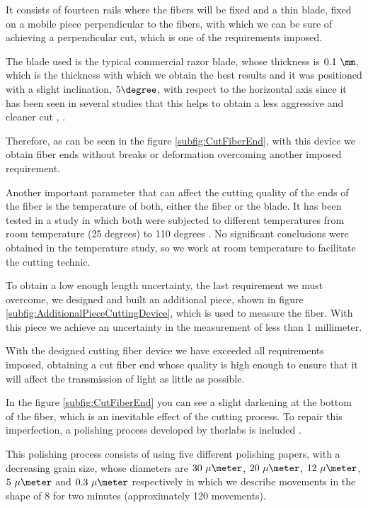 It consists of fourteen rails where the fibers will be fixed and a thin blade, fixed on a mobile piece perpendicular to the fibers, with which we can be sure of achieving a perpendicular cut, which is one of the requirements imposed.

The blade used is the typical commercial razor blade, whose thickness is $0.1~\mm$, which is the thickness with which we obtain the best results and it was positioned with a slight inclination, $5\degree$, with respect to the horizontal axis since it has been seen in several studies that this helps to obtain a less aggressive and cleaner cut  \cite{AngleBlade}, \cite{TemperatureBlade}.

Therefore, as can be seen in the figure \ref{subfig:CutFiberEnd}, with this device we obtain fiber ends without breaks or deformation overcoming another imposed requirement.

Another important parameter that can affect the cutting quality of the ends of the fiber is the temperature of both, either the fiber or the blade. It has been tested in a study in which both were subjected to different temperatures from room temperature (25 degrees) to 110 degrees \cite{TFGAlberto}. No significant conclusions were obtained in the temperature study, so we work at room temperature to facilitate the cutting technic.

To obtain a low enough length uncertainty, the last requirement we must overcome, we designed and built an additional piece, shown in figure \ref{subfig:AdditionalPieceCuttingDevice}, which is used to measure the fiber. With this piece we achieve an uncertainty in the measurement of less than 1 millimeter.

With the designed cutting fiber device we have exceeded all requirements imposed, obtaining a cut fiber end whose quality is high enough to ensure that it will affect the transmission of light as little as possible.

In the figure \ref{subfig:CutFiberEnd} you can see a slight darkening at the bottom of the fiber, which is an inevitable effect of the cutting process. To repair this imperfection, a polishing process developed by thorlabs is included \cite{DiamondThorlabs}. 

This polishing process consists of using five different polishing papers, with a decreasing grain size, whose diameters are $30~\mu\meter$, $20~\mu\meter$, $12~\mu\meter$, $5~\mu\meter$ and $0.3~\mu\meter$ respectively in which we describe movements in the shape of 8 for two minutes (approximately 120 movements). 

